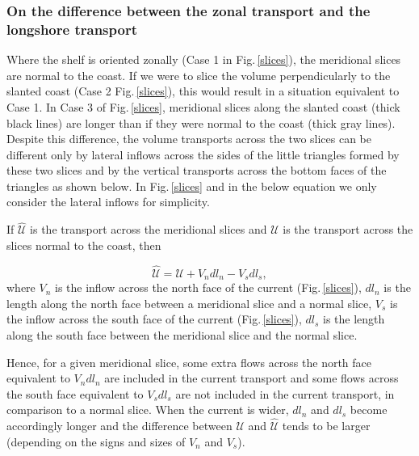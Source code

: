 \documentclass[preprint,3p,review,12pt]{elsarticle}
\begin{document}
\subsubsection{On the difference between the zonal transport and the longshore transport}
Where the shelf is oriented zonally (Case 1 in Fig.\,\ref{slices}), the meridional slices are normal to the coast. If we were to slice the volume perpendicularly to the slanted coast (Case 2 Fig.\,\ref{slices}), this would result in a situation equivalent to Case 1. In Case 3 of Fig.\,\ref{slices}, meridional slices along the slanted coast (thick black lines) are longer than if they were normal to the coast (thick gray lines). Despite this difference, the volume transports across the two slices can be different only by lateral inflows across the sides of the little triangles formed by these two slices and by the vertical transports across the bottom faces of the triangles as shown below. In Fig.\,\ref{slices} and in the below equation we only consider the lateral inflows for simplicity.

If $\mathcal{\hat{U}}$ is the transport across the meridional slices and $\mathcal{U}$ is the transport across the slices normal to the coast, then

\begin{equation} \label{eq:20}
\mathcal{\hat{U}} = \mathcal{U} + V_{n}dl_{n} - V_{s}dl_{s},
\end{equation}
%
where $V_{n}$ is the inflow across the north face of the current (Fig.\,\ref{slices}), $dl_{n}$ is the length along the north face between a meridional slice and a normal slice, $V_{s}$ is the inflow across the south face of the current (Fig.\,\ref{slices}), $dl_{s}$ is the length along the south face between the meridional slice and the normal slice.

Hence, for a given meridional slice, some extra flows across the north face equivalent to $V_{n}dl_{n}$ are included in the current transport and some flows across the south face equivalent to $V_{s}dl_{s}$ are not included in the current transport, in comparison to a normal slice. When the current is wider, $dl_n$ and $dl_s$ become accordingly longer and the difference between $\mathcal{U}$ and $\hat{\mathcal{U}}$ tends to be larger (depending on the signs and sizes of $V_n$ and $V_s$).
\end{document}
